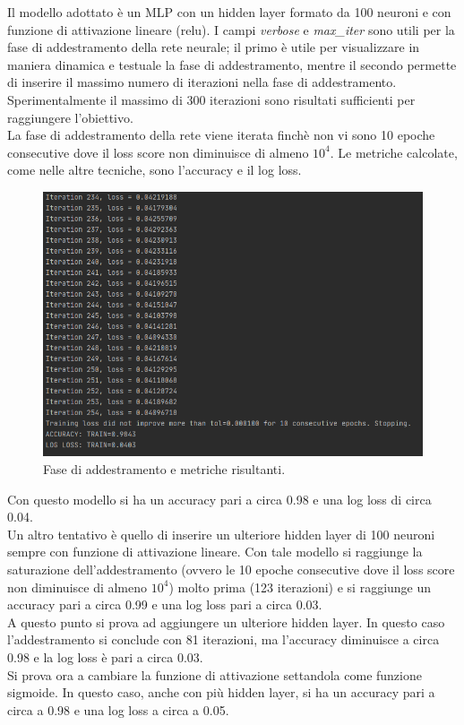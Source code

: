Il modello adottato è un MLP con un hidden layer formato da 100 neuroni e con funzione di attivazione lineare (relu). I campi \textit{verbose} e \textit{max\_iter} sono utili per la fase di addestramento della rete neurale; il primo è utile per visualizzare in maniera dinamica e testuale la fase di addestramento, mentre il secondo permette di inserire il massimo numero di iterazioni nella fase di addestramento. Sperimentalmente il massimo di 300 iterazioni sono risultati sufficienti per raggiungere l'obiettivo.\\
La fase di addestramento della rete viene iterata finchè non vi sono 10 epoche consecutive dove il loss score non diminuisce di almeno $10^4$. Le metriche calcolate, come nelle altre tecniche, sono l'accuracy e il log loss.\\
\begin{figure}[h]
	\centering   	
	\includegraphics[width=140mm]{image/mlpresults2.png}
	\caption{Fase di addestramento e metriche risultanti.}
\end{figure}
Con questo modello si ha un accuracy pari a circa 0.98 e una log loss di circa 0.04.\\
Un altro tentativo è quello di inserire un ulteriore hidden layer di 100 neuroni sempre con funzione di attivazione lineare. Con tale modello si raggiunge la saturazione dell'addestramento (ovvero le 10 epoche consecutive dove il loss score non diminuisce di almeno $10^4$) molto prima (123 iterazioni) e si raggiunge un accuracy pari a circa 0.99 e una log loss pari a circa 0.03.\\
A questo punto si prova ad aggiungere un ulteriore hidden layer. In questo caso l'addestramento si conclude con 81 iterazioni, ma l'accuracy diminuisce a circa 0.98 e la log loss è pari a circa 0.03.\\
Si prova ora a cambiare la funzione di attivazione settandola come funzione sigmoide. In questo caso, anche con più hidden layer, si ha un accuracy pari a circa a 0.98 e una log loss a circa a 0.05.

